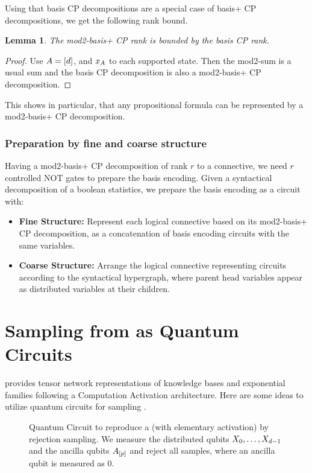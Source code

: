 \documentclass[aps,onecolumn,nofootinbib,pra]{article}
\newtheorem{lemma}{Lemma}
\begin{document}
    Using that basis CP decompositions are a special case of basis+ CP decompositions, we get the following rank bound.

    \begin{lemma}
        The mod2-basis+ CP rank is bounded by the basis CP rank.
    \end{lemma}
    \begin{proof}
        Use $A=[d]$, and $x_{A}$ to each supported state.
        Then the mod2-sum is a usual sum and the basis CP decomposition is also a mod2-basis+ CP decomposition.
    \end{proof}

    This shows in particular, that any propositional formula can be represented by a mod2-basis+ CP decomposition.

    \subsubsection{Preparation by fine and coarse structure}

    Having a mod2-basis+ CP decomposition of rank $r$ to a connective, we need $r$ controlled NOT gates to prepare the basis encoding.
    Given a syntactical decomposition of a boolean statistics, we prepare the basis encoding as a circuit with:
    \begin{itemize}
        \item \textbf{Fine Structure:} Represent each logical connective based on its mod2-basis+ CP decomposition, as a concatenation of basis encoding circuits with the same variables.
        \item \textbf{Coarse Structure:} Arrange the logical connective representing circuits according to the syntactical hypergraph, where parent head variables appear as distributed variables at their children.
    \end{itemize}


    \section{Sampling from \ComputationActivationNetworks{} as Quantum Circuits}

    \tnreason{} provides tensor network representations of knowledge bases and exponential families following a Computation Activation architecture.
    Here are some ideas to utilize quantum circuits for sampling \ComputationActivationNetworks{}.

    \begin{figure}
        \begin{center}
            
        \end{center}
        \caption{
            Quantum Circuit to reproduce a \ComputationActivationNetwork{} (with elementary activation) by rejection sampling.
            We measure the distributed qubits $X_{0},\ldots,X_{d-1}$ and the ancilla qubits $A_{[p]}$ and reject all samples, where an ancilla qubit is measured as $0$.
        }
    \end{figure}
\end{document}
